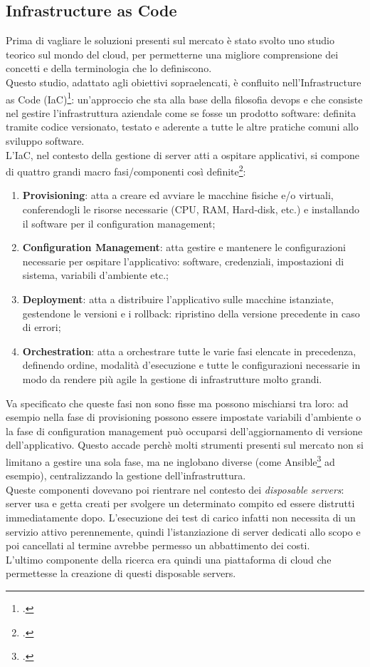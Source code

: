 \subsection{Infrastructure as Code}
Prima di vagliare le soluzioni presenti sul mercato è stato svolto uno studio teorico sul mondo del \gls{cloud}, per permetterne una migliore comprensione dei concetti e della terminologia che lo definiscono. \\
Questo studio, adattato agli obiettivi sopraelencati, è confluito nell'Infrastructure as Code (IaC)\footcite{article:iac}: un'approccio che sta alla base della filosofia \gls{devops} e che consiste nel gestire l'infrastruttura aziendale come se fosse un prodotto software: definita tramite codice versionato, testato e aderente a tutte le altre pratiche comuni allo sviluppo software. \\
L'IaC, nel contesto della gestione di server atti a ospitare applicativi, si compone di quattro grandi macro fasi/componenti così definite\footcite{article:iac-components}:
\begin{enumerate}
	\item \textbf{Provisioning}: atta a creare ed avviare le macchine fisiche e/o virtuali, conferendogli le risorse necessarie (CPU, RAM, Hard-disk, etc.) e installando il software per il configuration management;
	\item \textbf{Configuration Management}: atta gestire e mantenere le configurazioni necessarie per ospitare l'applicativo: software, credenziali, impostazioni di sistema, variabili d'ambiente etc.;
	\item \textbf{Deployment}: atta a distribuire l'applicativo sulle macchine istanziate, gestendone le versioni e i rollback: ripristino della versione precedente in caso di errori;
	\item \textbf{Orchestration}: atta a orchestrare tutte le varie fasi elencate in precedenza, definendo ordine, modalità d'esecuzione e tutte le configurazioni necessarie in modo da rendere più agile la gestione di infrastrutture molto grandi.
\end{enumerate}
Va specificato che queste fasi non sono fisse ma possono mischiarsi tra loro: ad esempio nella fase di provisioning possono essere impostate variabili d'ambiente o la fase di configuration management può occuparsi dell'aggiornamento di versione dell'applicativo. Questo accade perchè molti strumenti presenti sul mercato non si limitano a gestire una sola fase, ma ne inglobano diverse (come Ansible\footcite{site:ansible} ad esempio), centralizzando la gestione dell'infrastruttura. \\
Queste componenti dovevano poi rientrare nel contesto dei \textit{disposable servers}: server usa e getta creati per svolgere un determinato compito ed essere distrutti immediatamente dopo. L'esecuzione dei test di carico infatti non necessita di un servizio attivo perennemente, quindi l'istanziazione di server dedicati allo scopo e poi cancellati al termine avrebbe permesso un abbattimento dei costi. \\
L'ultimo componente della ricerca era quindi una piattaforma di \gls{cloud} che permettesse la creazione di questi disposable servers.
